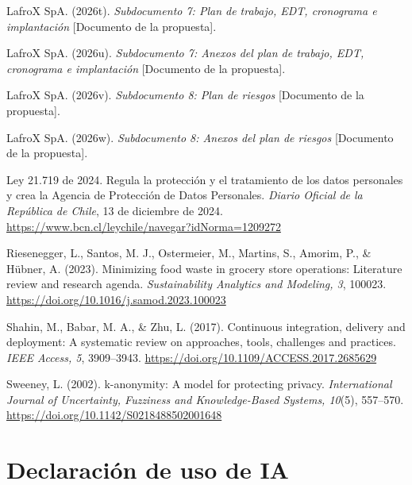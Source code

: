 \begin{list}{}{\setlength{\leftmargin}{1.27cm}\setlength{\itemindent}{-1.27cm}\setlength{\itemsep}{0.4em}\setlength{\parsep}{0pt}}
  \item \begin{samepage}LafroX SpA. (2026t). \emph{Subdocumento 7: Plan de trabajo, EDT, cronograma e implantación} [Documento de la propuesta].\par\end{samepage}
  \item \begin{samepage}LafroX SpA. (2026u). \emph{Subdocumento 7: Anexos del plan de trabajo, EDT, cronograma e implantación} [Documento de la propuesta].\par\end{samepage}
  \item \begin{samepage}LafroX SpA. (2026v). \emph{Subdocumento 8: Plan de riesgos} [Documento de la propuesta].\par\end{samepage}
  \item \begin{samepage}LafroX SpA. (2026w). \emph{Subdocumento 8: Anexos del plan de riesgos} [Documento de la propuesta].\par\end{samepage}
  \item Ley 21.719 de 2024. Regula la protección y el tratamiento de los datos personales y crea la Agencia de Protección de Datos Personales. \emph{Diario Oficial de la República de Chile}, 13 de diciembre de 2024. \url{https://www.bcn.cl/leychile/navegar?idNorma=1209272}
  \item Riesenegger, L., Santos, M. J., Ostermeier, M., Martins, S., Amorim, P., \& Hübner, A. (2023). Minimizing food waste in grocery store operations: Literature review and research agenda. \emph{Sustainability Analytics and Modeling, 3}, 100023. \url{https://doi.org/10.1016/j.samod.2023.100023}
  \item Shahin, M., Babar, M. A., \& Zhu, L. (2017). Continuous integration, delivery and deployment: A systematic review on approaches, tools, challenges and practices. \emph{IEEE Access, 5}, 3909–3943. \url{https://doi.org/10.1109/ACCESS.2017.2685629}
  \item Sweeney, L. (2002). k-anonymity: A model for protecting privacy. \emph{International Journal of Uncertainty, Fuzziness and Knowledge-Based Systems, 10}(5), 557–570. \url{https://doi.org/10.1142/S0218488502001648}
\end{list}

\section*{Declaración de uso de IA}


